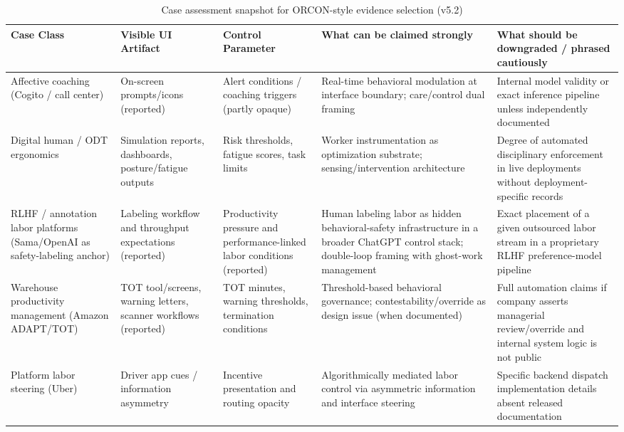 \documentclass[runningheads]{llncs}
\begin{document}
\begin{table}
\caption{Case assessment snapshot for ORCON-style evidence selection (v5.2)}\label{tab:case-assessment}
\centering
\small
\begin{tabular}{|p{2.4cm}|p{2.8cm}|p{2.3cm}|p{3.1cm}|p{3.1cm}|}
\hline
\textbf{Case Class} & \textbf{Visible UI Artifact} & \textbf{Control Parameter} & \textbf{What can be claimed strongly} & \textbf{What should be downgraded / phrased cautiously} \\
\hline
Affective coaching (Cogito / call center) & On-screen prompts/icons (reported) & Alert conditions / coaching triggers (partly opaque) & Real-time behavioral modulation at interface boundary; care/control dual framing \cite{delagarza2019time,cogito2023businesswire} & Internal model validity or exact inference pipeline unless independently documented \\
\hline
Digital human / ODT ergonomics & Simulation reports, dashboards, posture/fatigue outputs & Risk thresholds, fatigue scores, task limits & Worker instrumentation as optimization substrate; sensing/intervention architecture \cite{siemensPSXHuman,siemensHumanAdvanced} & Degree of automated disciplinary enforcement in live deployments without deployment-specific records \\
\hline
RLHF / annotation labor platforms (Sama/OpenAI as safety-labeling anchor) & Labeling workflow and throughput expectations (reported) & Productivity pressure and performance-linked labor conditions (reported) & Human labeling labor as hidden behavioral-safety infrastructure in a broader ChatGPT control stack; double-loop framing with ghost-work management \cite{perrigo2023time,gray2019ghost,kellogg2020algorithms} & Exact placement of a given outsourced labor stream in a proprietary RLHF preference-model pipeline \\
\hline
Warehouse productivity management (Amazon ADAPT/TOT) & TOT tool/screens, warning letters, scanner workflows (reported) & TOT minutes, warning thresholds, termination conditions & Threshold-based behavioral governance; contestability/override as design issue (when documented) \cite{gurley2022vice} & Full automation claims if company asserts managerial review/override and internal system logic is not public \\
\hline
Platform labor steering (Uber) & Driver app cues / information asymmetry & Incentive presentation and routing opacity & Algorithmically mediated labor control via asymmetric information and interface steering \cite{rosenblat2016uber} & Specific backend dispatch implementation details absent released documentation \\
\hline
\end{tabular}
\end{table}
\end{document}
